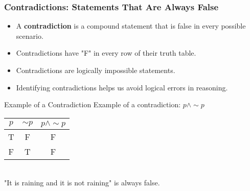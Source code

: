 \documentclass{beamer}
\begin{document}
                        \begin{frame}
                        \frametitle{Contradictions: Statements That Are Always False}
                        \begin{itemize}
                            \item A \textbf{contradiction} is a compound statement that is false in every possible scenario.
                            \item Contradictions have "F" in every row of their truth table.
                            \item Contradictions are logically impossible statements.
                            \item Identifying contradictions helps us avoid logical errors in reasoning.
                        \end{itemize}
                        
                        \begin{block}{Example of a Contradiction}
                            \scriptsize
                        Example of a contradiction: $p \wedge \sim p$\\[0.2cm]
                        \begin{tabular}{|c|c|c|}
                        \hline
                        $p$ & $\sim p$ & $p \wedge \sim p$ \\
                        \hline
                        T & F & F \\
                        \hline
                        F & T & F \\
                        \hline
                        \end{tabular}\\[0.3cm]
                        "It is raining and it is not raining" is always false.
                        \end{block}                       
                    \end{frame}
                        
\end{document}
